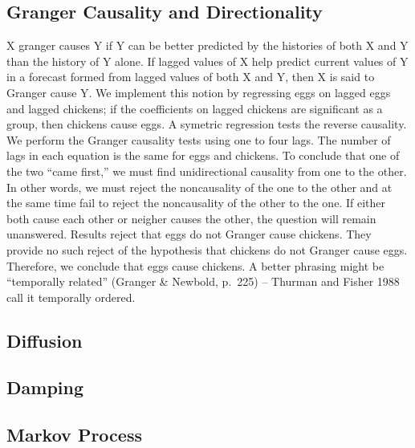 \documentclass[]{article}
\begin{document}
\hypertarget{granger-causality-and-directionality}{%
\subsection{Granger Causality and
Directionality}\label{granger-causality-and-directionality}}

X granger causes Y if Y can be better predicted by the histories of both
X and Y than the history of Y alone. If lagged values of X help predict
current values of Y in a forecast formed from lagged values of both X
and Y, then X is said to Granger cause Y. We implement this notion by
regressing eggs on lagged eggs and lagged chickens; if the coefficients
on lagged chickens are significant as a group, then chickens cause eggs.
A symetric regression tests the reverse causality. We perform the
Granger causality tests using one to four lags. The number of lags in
each equation is the same for eggs and chickens. To conclude that one of
the two ``came first,'' we must find unidirectional causality from one
to the other. In other words, we must reject the noncausality of the one
to the other and at the same time fail to reject the noncausality of the
other to the one. If either both cause each other or neigher causes the
other, the question will remain unanswered. Results reject that eggs do
not Granger cause chickens. They provide no such reject of the
hypothesis that chickens do not Granger cause eggs. Therefore, we
conclude that eggs cause chickens. A better phrasing might be
``temporally related'' (Granger \& Newbold, p.~225) -- Thurman and
Fisher 1988 call it temporally ordered.

\hypertarget{diffusion}{%
\subsection{Diffusion}\label{diffusion}}

\hypertarget{damping}{%
\subsection{Damping}\label{damping}}

\hypertarget{markov-process}{%
\subsection{Markov Process}\label{markov-process}}
\end{document}
